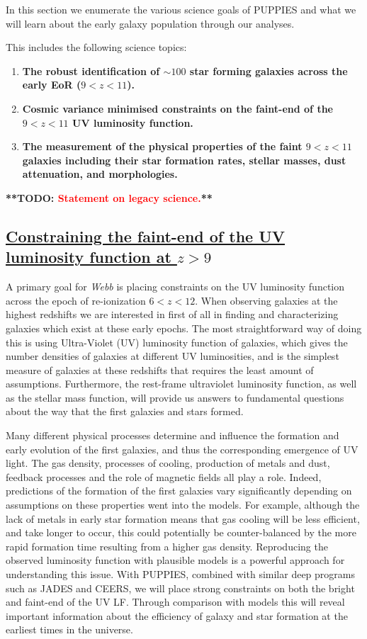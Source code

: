 \documentclass[12pt]{article}
\newcommand{\todo}[1]{\textbf{**TODO: \textcolor{red}{#1}**}}
\begin{document}
\noindent In this section we enumerate the various science goals of PUPPIES and what we will learn about the early galaxy population through our analyses.

This includes the following science topics:

\begin{enumerate}
\item \textbf{The robust identification of $\sim 100$ star forming galaxies across the early EoR ($9<z<11$).}
\item \textbf{Cosmic variance minimised constraints on the faint-end of the $9<z<11$ UV luminosity function.} 
\item \textbf{The measurement of the physical properties of the faint $9<z<11$ galaxies including their star formation rates, stellar masses, dust attenuation, and morphologies.}
\end{enumerate}

\todo{Statement on legacy science.}

\subsection{\bf \underline{Constraining the faint-end of the UV luminosity function at $z > 9$}}\label{sec:UVLF}

A primary goal for \emph{Webb} is placing constraints on the UV luminosity function across the epoch of re-ionization $6<z<12$. When observing galaxies at the highest redshifts we are interested in first of all in finding and characterizing galaxies which exist at these early epochs.  The most straightforward way of doing this is using Ultra-Violet (UV) luminosity function of galaxies, which gives the number densities of galaxies at different UV luminosities, and is the simplest measure of galaxies at these redshifts that requires the least amount of assumptions.  Furthermore, the rest-frame ultraviolet luminosity function, as well as the stellar mass function, will provide us answers to fundamental questions about the way that the first galaxies and stars formed.

Many different physical processes determine and influence the formation and early evolution of the first galaxies, and thus the corresponding emergence of UV light. The gas density, processes of cooling, production of metals and dust, feedback processes and the role of magnetic fields all play a role. Indeed, predictions of the formation of the first galaxies vary significantly depending on assumptions on these properties went into the models. For example, although the lack of metals in early star formation means that gas cooling will be less efficient, and take longer to occur, this could potentially be counter-balanced by the more rapid formation time resulting from a higher gas density. Reproducing the observed luminosity function with plausible models is a powerful approach for understanding this issue. With PUPPIES, combined with similar deep programs such as JADES and CEERS, we will place strong constraints on both the bright and faint-end of the UV LF. Through comparison with models this will reveal important information about the efficiency of galaxy and star formation at the earliest times in the universe.
 
\end{document}
